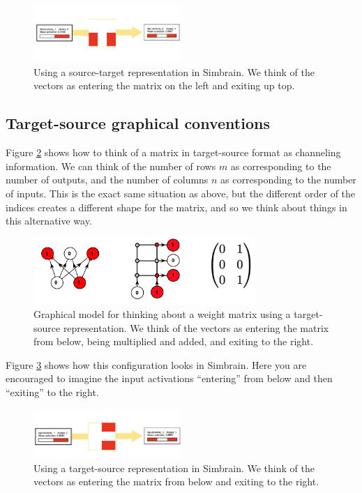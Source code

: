 \begin{figure}[h]
\centering
\includegraphics[width=0.5\textwidth]{images/sourceTargetSimbrain.png}
\caption[Jeff Yoshimi.]{Using a source-target representation in Simbrain. We think of the vectors as entering the matrix on the left and exiting up top.}
\label{sourceTargetSimbrain}
\end{figure}

\subsection{Target-source graphical conventions}

Figure \ref{targetSourceConvention} shows how to think of a matrix in target-source format as channeling information.  We can think of the number of rows $m$ as corresponding to the number of outputs, and the number of columns $n$ as corresponding to the number of inputs. This is the exact same situation as above, but the different order of the indices creates a different shape for the matrix, and so we  think about things in this alternative way.  

\begin{figure}[h]
\centering
\includegraphics[width=0.75\textwidth]{images/targetSource.png}
\caption[Jeff Yoshimi.]{Graphical model for thinking about a weight matrix using a target-source representation. We think of the vectors as entering the matrix from below, being multiplied and added, and exiting to the right. }
\label{targetSourceConvention}
\end{figure}

Figure \ref{targetSourceSimbrain} shows how this configuration looks in Simbrain. Here you are encouraged to imagine  the input activations  ``entering'' from below and then ``exiting'' to the right.

\begin{figure}[h]
\centering
\includegraphics[width=0.5\textwidth]{images/targetSourceSimbrain.png}
\caption[Jeff Yoshimi.]{Using a target-source representation in Simbrain. We think of the vectors as entering the matrix from below and exiting to the right.}
\label{targetSourceSimbrain}
\end{figure}

